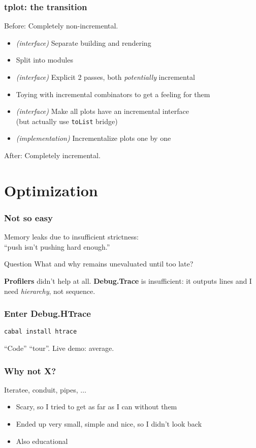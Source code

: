 \documentclass{beamer}
\begin{document}
\begin{frame}
  \frametitle{tplot: the transition}
  Before: Completely non-incremental.
  \begin{itemize}
    \item \emph{(interface)} Separate building and rendering
    \item Split into modules
    \item \emph{(interface)} Explicit 2 passes, both \emph{potentially} incremental
    \item Toying with incremental combinators to get a feeling for them
    \item \emph{(interface)} Make all plots have an incremental interface \\
    (but actually use \texttt{toList} bridge)
    \item \emph{(implementation)} Incrementalize plots one by one
  \end{itemize}
  After: Completely incremental.
\end{frame}

\section{Optimization}

\begin{frame}
  \frametitle{Not so easy}
  Memory leaks due to insufficient strictness:\\
  ``push isn't pushing hard enough.''

  \begin{center}
  \begin{block}{Question}
  What and why remains unevaluated until too late?
  \end{block}
  \end{center}

  \textbf{Profilers} didn't help at all. \textbf{Debug.Trace} is insufficient: it outputs lines and I need \emph{hierarchy}, not sequence.
\end{frame}

\begin{frame}
  \frametitle{Enter Debug.HTrace}

  \texttt{cabal install htrace}

  ``Code'' ``tour''. Live demo: average.
\end{frame}

\begin{frame}
  \frametitle{Why not X?}

  Iteratee, conduit, pipes, $\ldots$

  \begin{itemize}
    \item Scary, so I tried to get as far as I can without them
    \item Ended up very small, simple and nice, so I didn't look back
    \item Also educational
  \end{itemize}
\end{frame}
\end{document}
